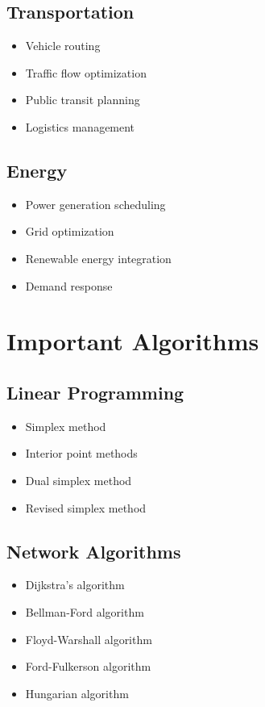 \documentclass[11pt]{article}
\theoremstyle{definition}
\begin{document}
\subsection{Transportation}
\begin{itemize}
    \item Vehicle routing
    \item Traffic flow optimization
    \item Public transit planning
    \item Logistics management
\end{itemize}

\subsection{Energy}
\begin{itemize}
    \item Power generation scheduling
    \item Grid optimization
    \item Renewable energy integration
    \item Demand response
\end{itemize}

\section{Important Algorithms}

\subsection{Linear Programming}
\begin{itemize}
    \item Simplex method
    \item Interior point methods
    \item Dual simplex method
    \item Revised simplex method
\end{itemize}

\subsection{Network Algorithms}
\begin{itemize}
    \item Dijkstra's algorithm
    \item Bellman-Ford algorithm
    \item Floyd-Warshall algorithm
    \item Ford-Fulkerson algorithm
    \item Hungarian algorithm
\end{itemize}
\end{document}
